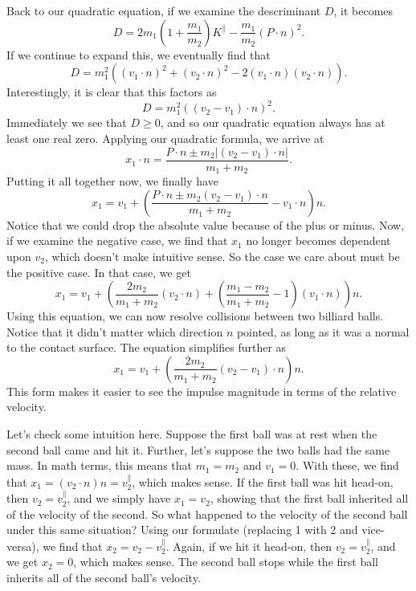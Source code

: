 \documentclass[12pt]{article}
\newcommand{\prl}{\parallel}
\begin{document}
Back to our quadratic equation, if we examine the descriminant $D$, it becomes
\begin{equation*}
D = 2m_1\left(1+\frac{m_1}{m_2}\right)K^{\prl}-\frac{m_1}{m_2}(P\cdot n)^2.
\end{equation*}
If we continue to expand this, we eventually find that
\begin{equation*}
D = m_1^2\left((v_1\cdot n)^2 + (v_2\cdot n)^2 - 2(v_1\cdot n)(v_2\cdot n)\right).
\end{equation*}
Interestingly, it is clear that this factors as
\begin{equation*}
D = m_1^2\left((v_2-v_1)\cdot n\right)^2.
\end{equation*}
Immediately we see that $D\geq 0$, and so our quadratic equation always has at least one real zero.
Applying our quadratic formula, we arrive at
\begin{equation*}
x_1\cdot n = \frac{P\cdot n\pm m_2|(v_2-v_1)\cdot n|}{m_1+m_2}.
\end{equation*}
Putting it all together now, we finally have
\begin{equation*}
x_1 = v_1 + \left(\frac{P\cdot n\pm m_2(v_2-v_1)\cdot n}{m_1+m_2}-v_1\cdot n\right)n.
\end{equation*}
Notice that we could drop the absolute value because of the plus or minus.  Now, if we examine the
negative case, we find that $x_1$ no longer becomes dependent upon $v_2$, which doesn't make intuitive sense.
So the case we care about must be the positive case.  In that case, we get
\begin{equation*}
x_1 = v_1 + \left(\frac{2m_2}{m_1+m_2}(v_2\cdot n)+\left(\frac{m_1-m_2}{m_1+m_2}-1\right)(v_1\cdot n)\right)n.
\end{equation*}
Using this equation, we can now resolve collisions between two billiard balls.  Notice that it didn't matter which direction $n$ pointed, as long as it was a normal to the contact surface.  The equation simplifies further as
\begin{equation*}
x_1 = v_1 + \left(\frac{2m_2}{m_1+m_2}(v_2-v_1)\cdot n\right)n.
\end{equation*}
This form makes it easier to see the impulse magnitude in terms of the relative velocity.

Let's check some intuition here.
Suppose the first ball was at rest when the second ball came and hit it.  Further, let's suppose the two balls
had the same mass.  In math terms, this means that $m_1=m_2$ and $v_1=0$.  With these, we find
that $x_1=(v_2\cdot n)n=v_2^{\prl}$, which makes sense.  If the first ball was hit head-on, then $v_2=v_2^{\prl}$,
and we simply have $x_1=v_2$, showing that the first ball inherited all of the velocity of the second.  So what
happened to the velocity of the second ball under this same situation?  Using our formulate (replacing 1 with 2 and vice-versa),
we find that $x_2=v_2-v_2^{\prl}$.  Again, if we hit it head-on, then $v_2=v_2^{\prl}$, and we get $x_2=0$,
which makes sense.  The second ball stops while the first ball inherits all of the second ball's velocity.
\end{document}
